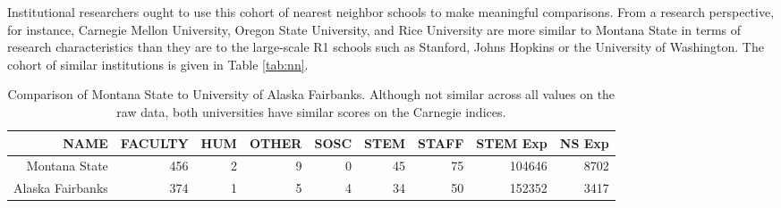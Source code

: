 \documentclass{article}
\begin{document}
Institutional researchers ought to use this cohort of nearest neighbor schools to make meaningful comparisons. From a research perspective, for instance, Carnegie Mellon University, Oregon State University, and Rice University are more similar to Montana State in terms of research characteristics than they are to the large-scale R1 schools such as Stanford, Johns Hopkins or the University of Washington. The cohort of similar institutions is given in Table \ref{tab:nn}.


\begin{table}[h]
\centering
\begin{tabular}{|rrrrrrrrr|}
  \hline
NAME & FACULTY & HUM & OTHER & SOSC & STEM & STAFF & STEM Exp & NS Exp \\ 
  \hline
Montana State &   456 &   2 &   9 &   0 &  45 &  75 & 104646 & 8702 \\ 
Alaska Fairbanks &   374 &   1 &   5 &   4 &  34 &  50 & 152352 & 3417 \\ 
   \hline
\end{tabular}
\caption{\label{tab:UAA} Comparison of Montana State to University of Alaska Fairbanks. Although not similar across all values on the raw data, both universities have similar scores on the Carnegie indices. }
\end{table}
\end{document}
